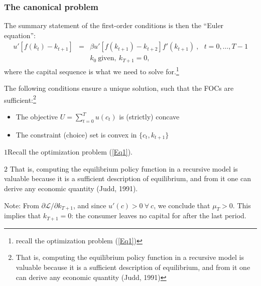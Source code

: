 \documentclass[10pt, handout]{beamer}
\begin{document}
\begin{frame}
\frametitle{ The canonical problem}
The summary statement of the first-order conditions is then the ``Euler equation'':
\begin{eqnarray} \nonumber
u'[f(k_t)-k_{t+1}] &=& {\beta}u'[f(k_{t+1})-k_{t+2}]f'(k_{t+1}) ~, ~~~ t = 0, \ldots, T-1 \\ \nonumber
 &&  k_{0} ~{\text{given}}, ~ k_{T+1}=0 ,
\end{eqnarray}
where the capital sequence is what we need to solve for.\footnote{recall the optimization problem (\ref{Eq1})} \vskip0.1in

The following conditions ensure a unique solution, such that the FOCs are sufficient:\footnote{\scriptsize That is, computing the equilibrium policy function in a recursive model is valuable because it is a sufficient description of equilibrium, and from it one can derive any economic quantity (Judd, 1991)}
\begin{itemize}
\item The objective $U = \sum^{T}_{t=0} u(c_t)$ is (strictly) concave 
\item The constraint (choice) set is convex in $\{c_t , k_{t+1}\}$
\end{itemize}

\vfill

{\scriptsize {$1$}Recall the optimization problem (\ref{Eq1}).}

{\scriptsize $2$ That is, computing the equilibrium policy function in a recursive model is valuable because it is a sufficient description of equilibrium, and from it one can derive any economic quantity (Judd, 1991).}

{\scriptsize Note: From $\partial\mathcal{L}/\partial{k_{T+1}}$, and since $u'(c) > 0 ~ \forall ~ c$, we conclude that $\mu_{T} > 0$. This implies that $k_{T+1} = 0$: the consumer leaves no capital for after the last period.}

\end{frame}
\end{document}
